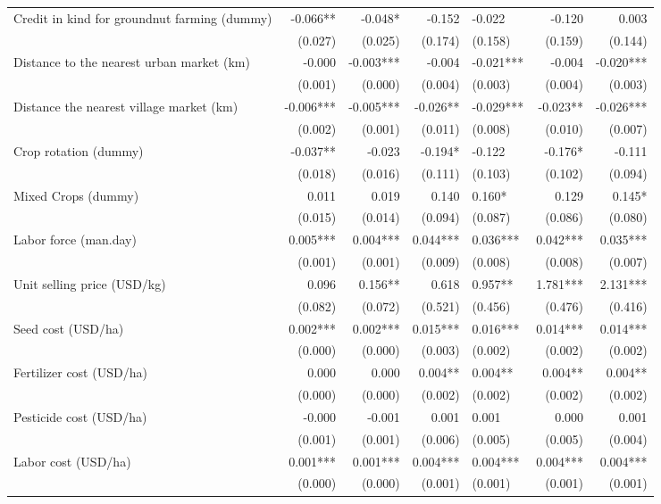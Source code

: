 \documentclass[
]{article}
\begin{document}
\begin{landscape}
\begin{longtable}[t]{lrrrlrr}
Credit in kind for groundnut farming (dummy) & -0.066** & -0.048* & -0.152 & -0.022 & -0.120 & 0.003\\
 & (0.027) & (0.025) & (0.174) & (0.158) & (0.159) & (0.144)\\
Distance to the nearest urban market (km) & -0.000 & -0.003*** & -0.004 & -0.021*** & -0.004 & -0.020***\\
\addlinespace
 & (0.001) & (0.000) & (0.004) & (0.003) & (0.004) & (0.003)\\
Distance the nearest village market (km) & -0.006*** & -0.005*** & -0.026** & -0.029*** & -0.023** & -0.026***\\
 & (0.002) & (0.001) & (0.011) & (0.008) & (0.010) & (0.007)\\
Crop rotation (dummy) & -0.037** & -0.023 & -0.194* & -0.122 & -0.176* & -0.111\\
 & (0.018) & (0.016) & (0.111) & (0.103) & (0.102) & (0.094)\\
\addlinespace
Mixed Crops (dummy) & 0.011 & 0.019 & 0.140 & 0.160* & 0.129 & 0.145*\\
 & (0.015) & (0.014) & (0.094) & (0.087) & (0.086) & (0.080)\\
Labor force (man.day) & 0.005*** & 0.004*** & 0.044*** & 0.036*** & 0.042*** & 0.035***\\
 & (0.001) & (0.001) & (0.009) & (0.008) & (0.008) & (0.007)\\
Unit selling price (USD/kg) & 0.096 & 0.156** & 0.618 & 0.957** & 1.781*** & 2.131***\\
\addlinespace
 & (0.082) & (0.072) & (0.521) & (0.456) & (0.476) & (0.416)\\
Seed cost (USD/ha) & 0.002*** & 0.002*** & 0.015*** & 0.016*** & 0.014*** & 0.014***\\
 & (0.000) & (0.000) & (0.003) & (0.002) & (0.002) & (0.002)\\
Fertilizer cost (USD/ha) & 0.000 & 0.000 & 0.004** & 0.004** & 0.004** & 0.004**\\
 & (0.000) & (0.000) & (0.002) & (0.002) & (0.002) & (0.002)\\
\addlinespace
Pesticide cost (USD/ha) & -0.000 & -0.001 & 0.001 & 0.001 & 0.000 & 0.001\\
 & (0.001) & (0.001) & (0.006) & (0.005) & (0.005) & (0.004)\\
Labor cost (USD/ha) & 0.001*** & 0.001*** & 0.004*** & 0.004*** & 0.004*** & 0.004***\\
 & (0.000) & (0.000) & (0.001) & (0.001) & (0.001) & (0.001)\\

\end{longtable}
\end{landscape}
\end{document}

